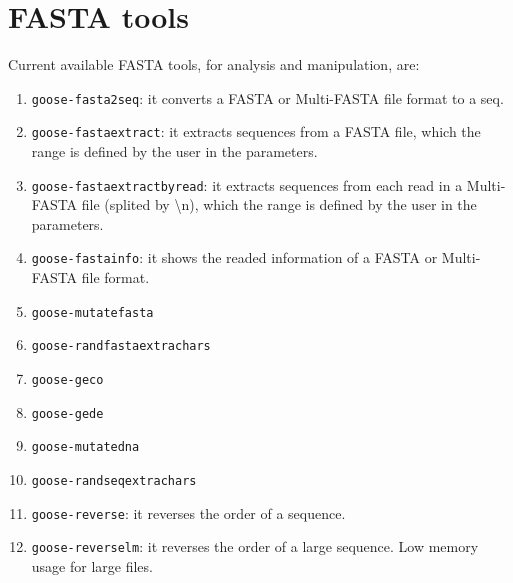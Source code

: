 \chapter{FASTA tools}
\label{fasta}

Current available FASTA tools, for analysis and manipulation, are:
\begin{enumerate}
\item \texttt{goose-fasta2seq}: it converts a FASTA or Multi-FASTA file format to a seq.
\item \texttt{goose-fastaextract}: it extracts sequences from a FASTA file, which the range is defined by the user in the parameters.
\item \texttt{goose-fastaextractbyread}: it extracts sequences from each read in a Multi-FASTA file (splited by \textbackslash n), which the range is defined by the user in the parameters.
\item \texttt{goose-fastainfo}: it shows the readed information of a FASTA or Multi-FASTA file format.
\item \texttt{goose-mutatefasta}
\item \texttt{goose-randfastaextrachars}
\item \texttt{goose-geco}
\item \texttt{goose-gede}
\item \texttt{goose-mutatedna}
\item \texttt{goose-randseqextrachars}
\item \texttt{goose-reverse}: it reverses the order of a sequence.
\item \texttt{goose-reverselm}: it reverses the order of a large sequence. Low memory usage for large files.
\end{enumerate}




 

%
%
%
%
%
%
%